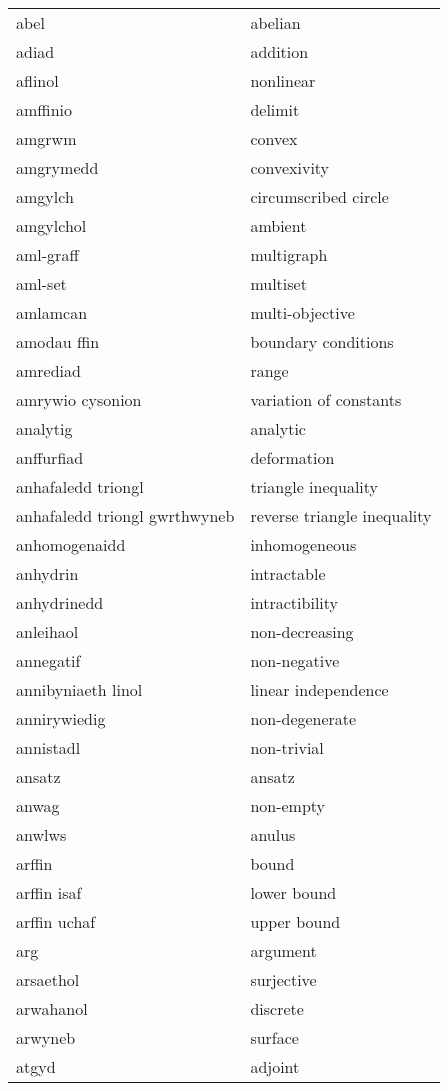\begin{supertabular}{p{0.22\textwidth}p{0.22\textwidth}}
\midrule
abel & abelian \\
adiad & addition \\
aflinol & nonlinear \\
amffinio & delimit \\
amgrwm & convex \\
amgrymedd & convexivity \\
amgylch & circumscribed circle \\
amgylchol & ambient \\
aml-graff & multigraph \\
aml-set & multiset \\
amlamcan & multi-objective \\
amodau ffin & boundary conditions \\
amrediad & range \\
amrywio cysonion & variation of constants \\
analytig & analytic \\
anffurfiad & deformation \\
anhafaledd triongl & triangle inequality \\
anhafaledd triongl gwrthwyneb & reverse triangle inequality \\
anhomogenaidd & inhomogeneous \\
anhydrin & intractable \\
anhydrinedd & intractibility \\
anleihaol & non-decreasing \\
annegatif & non-negative \\
annibyniaeth linol & linear independence \\
annirywiedig & non-degenerate \\
annistadl & non-trivial \\
ansatz & ansatz \\
anwag & non-empty \\
anwlws & anulus \\
arffin & bound \\
arffin isaf & lower bound \\
arffin uchaf & upper bound \\
arg & argument \\
arsaethol & surjective \\
arwahanol & discrete \\
arwyneb & surface \\
atgyd & adjoint \\

\end{supertabular}
